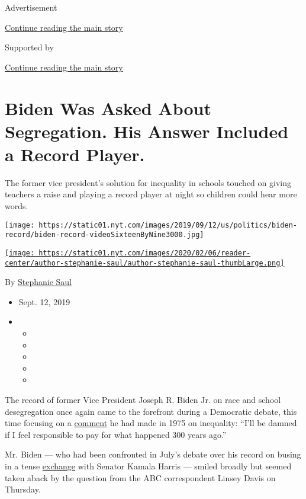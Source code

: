 Advertisement

\protect\hyperlink{after-top}{Continue reading the main story}

Supported by

\protect\hyperlink{after-sponsor}{Continue reading the main story}

\hypertarget{biden-was-asked-about-segregation-his-answer-included-a-record-player}{%
\section{Biden Was Asked About Segregation. His Answer Included a Record
Player.}\label{biden-was-asked-about-segregation-his-answer-included-a-record-player}}

The former vice president's solution for inequality in schools touched
on giving teachers a raise and playing a record player at night so
children could hear more words.

\texttt{[image: https://static01.nyt.com/images/2019/09/12/us/politics/biden-record/biden-record-videoSixteenByNine3000.jpg]}

\href{https://www.nytimes.com/by/stephanie-saul}{\texttt{[image: https://static01.nyt.com/images/2020/02/06/reader-center/author-stephanie-saul/author-stephanie-saul-thumbLarge.png]}}

By \href{https://www.nytimes.com/by/stephanie-saul}{Stephanie Saul}

\begin{itemize}
\item
  Sept. 12, 2019
\item
  \begin{itemize}
  \item
  \item
  \item
  \item
  \item
  \end{itemize}
\end{itemize}

The record of former Vice President Joseph R. Biden Jr. on race and
school desegregation once again came to the forefront during a
Democratic debate, this time focusing on a
\href{https://www.nytimes.com/2019/03/11/opinion/biden-busing-integration.html}{comment}
he had made in 1975 on inequality: ``I'll be damned if I feel
responsible to pay for what happened 300 years ago.''

Mr. Biden --- who had been confronted in July's debate over his record
on busing in a tense
\href{https://www.nytimes.com/2019/07/31/us/politics/kamala-harris-biden-busing.html}{exchange}
with Senator Kamala Harris --- smiled broadly but seemed taken aback by
the question from the ABC correspondent Linsey Davis on Thursday.

